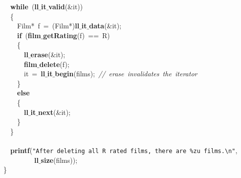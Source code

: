 \documentclass{article}
\begin{document}
\mbox{}\ \ \textbf{while}\ (\textbf{ll$\_$it$\_$valid}(\&it)) \\
\mbox{}\ \ \{ \\
\mbox{}\ \ \ \ Film*\ f\ =\ (Film*)\textbf{ll$\_$it$\_$data}(\&it); \\
\mbox{}\ \ \ \ \textbf{if}\ (\textbf{film$\_$getRating}(f)\ ==\ R) \\
\mbox{}\ \ \ \ \{ \\
\mbox{}\ \ \ \ \ \ \textbf{ll$\_$erase}(\&it); \\
\mbox{}\ \ \ \ \ \ \textbf{film$\_$delete}(f); \\
\mbox{}\ \ \ \ \ \ it\ =\ \textbf{ll$\_$it$\_$begin}(films);\ \textit{//\ erase\ invalidates\ the\ iterator} \\
\mbox{}\ \ \ \ \} \\
\mbox{}\ \ \ \ \textbf{else} \\
\mbox{}\ \ \ \ \{ \\
\mbox{}\ \ \ \ \ \ \textbf{ll$\_$it$\_$next}(\&it); \\
\mbox{}\ \ \ \ \} \\
\mbox{}\ \ \} \\
\mbox{} \\
\mbox{}\ \ \textbf{printf}(\texttt{"{}After\ deleting\ all\ R\ rated\ films,\ there\ are\ \%zu\ films.}\texttt{\textbackslash{}n}\texttt{"{}}, \\
\mbox{}\ \ \ \ \ \ \ \ \ \textbf{ll$\_$size}(films)); \\
\mbox{}\} \\
\mbox{}
\end{document}
